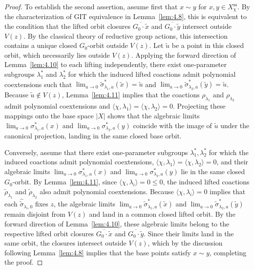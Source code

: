 \documentclass[11pt,a4paper,reqno,noamsfonts]{amsart}
\numberwithin{equation}{section}
\theoremstyle{definition}
\theoremstyle{remark}
\begin{document}
\begin{proof}
To establish the second assertion, assume first that $x \sim y$ for $x,y \in X_{\chi}^{\mathrm{ss}}$. By the characterization of GIT equivalence in Lemma~\ref{lem:4.8}, this is equivalent to the condition that the lifted orbit closures $\overline{G_{0}\cdot \tilde{x}}$ and $\overline{G_{0}\cdot \tilde{y}}$ intersect outside $V(z)$. By the classical theory of reductive group actions, this intersection contains a unique closed $G_{0}$-orbit outside $V(z)$. Let $\tilde{u}$ be a point in this closed orbit, which necessarily lies outside $V(z)$. Applying the forward direction of Lemma~\ref{lem:4.10} to each lifting independently, there exist one-parameter subgroups $\lambda _{1}^{*}$ and $\lambda _{2}^{*}$ for which the induced lifted coactions admit polynomial coextensions such that $\displaystyle\lim_{a \to 0} \tilde{\sigma}_{\lambda_1,a}^*(\tilde{x}) = \tilde{u}$ and $\displaystyle\lim_{a \to 0} \tilde{\sigma}_{\lambda_2,a}^*(\tilde{y}) = \tilde{u}$. Because $\tilde{u} \notin V(z)$, Lemma~\ref{lem:4.11} implies that the coactions $\rho _{\lambda _{1}}$ and $\rho _{\lambda _{2}}$ admit polynomial coextensions and $\langle \chi,\lambda_1 \rangle = \langle \chi,\lambda_2 \rangle = 0$. Projecting these mappings onto the base space $\lvert X \rvert$ shows that the algebraic limits $\displaystyle\lim_{a \to 0} \sigma_{\lambda_1,a}^*(x)$ and $\displaystyle\lim_{a \to 0} \sigma_{\lambda_2,a}^*(y)$ coincide with the image of $\tilde{u}$ under the canonical projection, landing in the same closed base orbit.

Conversely, assume that there exist one-parameter subgroups $\lambda_1^*, \lambda_2^*$ for which the induced coactions admit polynomial coextensions, $\langle \chi,\lambda_1 \rangle = \langle \chi,\lambda_2 \rangle = 0$, and their algebraic limits $\displaystyle\lim_{a \to 0} \sigma_{\lambda_1,a}^*(x)$ and $\displaystyle\lim_{a \to 0} \sigma_{\lambda_2,a}^*(y)$ lie in the same closed $G_{0}$-orbit. By Lemma~\ref{lem:4.11}, since $\langle \chi, \lambda_i \rangle = 0 \le 0$, the induced lifted coactions $\tilde{\rho }_{\lambda _{1}}$ and $\tilde{\rho }_{\lambda _{2}}$ also admit polynomial coextensions. Because $\langle \chi, \lambda_i \rangle = 0$ implies that each $\hat{\tilde{\sigma}}_{\lambda_i,0}$ fixes $z$, the algebraic limits $\displaystyle\lim_{a \to 0} \tilde{\sigma}_{\lambda_1,a}^*(\tilde{x})$ and $\displaystyle\lim_{a \to 0} \tilde{\sigma}_{\lambda_2,a}^*(\tilde{y})$ remain disjoint from $V(z)$ and land in a common closed lifted orbit. By the forward direction of Lemma~\ref{lem:4.10}, these algebraic limits belong to the respective lifted orbit closures $\overline{G_{0}\cdot \tilde{x}}$ and $\overline{G_{0}\cdot \tilde{y}}$. Since their limits land in the same orbit, the closures intersect outside $V(z)$, which by the discussion following Lemma~\ref{lem:4.8} implies that the base points satisfy $x \sim y$, completing the proof.
\end{proof}
\end{document}
